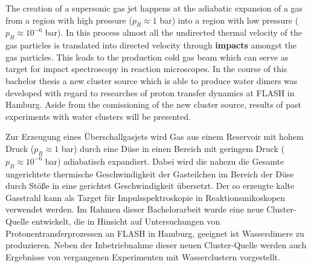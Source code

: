 \begin{center}\large{}\end{center}

The creation of a supersonic gas jet happens at the adiabatic expansion of a gas from a region with high pressure ($p_R \approx 1 $ bar) into a region with low pressure ($p_B \approx 10^{-6}$ bar). In this process almost all the undirected thermal velocity of the gas particles is translated into directed velocity through \textbf{impacts} amongst the gas particles. This leads to the production cold gas beam which can serve as target for impact spectroscopy in reaction microscopes.
In the course of this bachelor thesis a new cluster source which is able to produce water dimers was developed with regard to researches of proton transfer dynamics at FLASH in Hamburg. Aside from the comissioning of the new cluster source, results of past experiments with water clusters will be presented.

\begin{center}\large{}\end{center}

Zur Erzeugung eines Überschallgasjets wird Gas aus einem Reservoir mit hohem Druck ($p_R \approx 1 $ bar) durch eine Düse in einen Bereich mit geringem Druck ($p_B \approx 10^{-6}$ bar) adiabatisch expandiert. Dabei wird die nahezu die Gesamte ungerichtete thermische Geschwindigkeit der Gasteilchen im Bereich der Düse durch Stöße in eine gerichtet Geschwindigkeit übersetzt. Der so erzeugte kalte Gasstrahl kann als Target für Impulsspektroskopie in Reaktionsmikoskopen verwendet werden. Im Rahmen dieser Bachelorarbeit wurde eine neue Cluster-Quelle entwickelt, die in Hinsicht auf Untersuchungen von Protonentransferprozessen an FLASH in Hamburg, geeignet ist Wasserdimere zu produzieren. Neben der Inbetriebnahme dieser neuen Cluster-Quelle werden auch Ergebnisse von vergangenen Experimenten mit Wasserclustern vorgestellt.

\newpage
